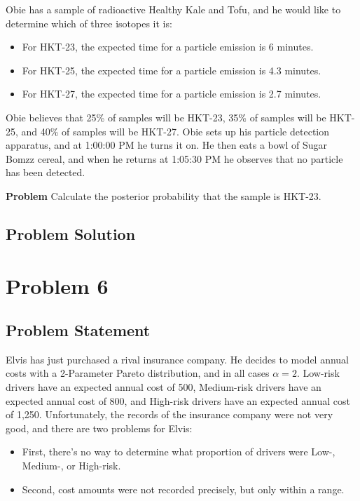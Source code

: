 \documentclass[12pt]{article}
\theoremstyle{definition}
\begin{document}
Obie has a sample of radioactive Healthy Kale and Tofu, and he would like to determine which of three isotopes it is:
\begin{itemize}
	\item For HKT-23, the expected time for a particle emission is 6 minutes.
	\item For HKT-25, the expected time for a particle emission is 4.3 minutes.
	\item For HKT-27, the expected time for a particle emission is 2.7 minutes.
\end{itemize}
Obie believes that 25\% of samples will be HKT-23, 35\% of samples will be HKT-25, and 40\% of samples will be HKT-27.
Obie sets up his particle detection apparatus, and at 1:00:00 PM he turns it on. He then eats a bowl of Sugar Bomzz cereal, and when he returns at 1:05:30 PM he observes that no particle has been detected.

\bigskip
\noindent
{\bf Problem} Calculate the posterior probability that the sample is HKT-23.


\subsection*{Problem Solution}




\newpage
\section*{Problem 6}

\subsection*{Problem Statement}

Elvis has just purchased a rival insurance company. He decides to model annual costs with a 2-Parameter Pareto distribution, and in all cases $\alpha = 2$. Low-risk drivers have an expected annual cost of 500, Medium-risk drivers have an expected annual cost of 800, and High-risk drivers have an expected annual cost of 1,250. Unfortunately, the records of the insurance company were not very good, and there are two problems for Elvis:
\begin{itemize}
	\item First, there's no way to determine what proportion of drivers were Low-, Medium-, or High-risk.
	\item Second, cost amounts were not recorded precisely, but only within a range.
\end{itemize}
\end{document}
